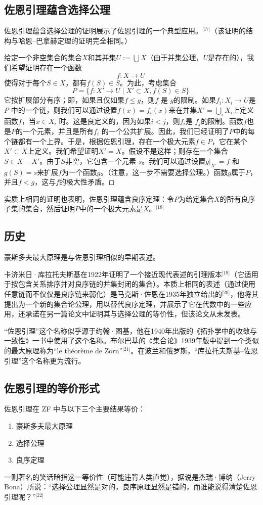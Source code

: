 \subsection{佐恩引理蕴含选择公理} 
佐恩引理蕴含选择公理的证明展示了佐恩引理的一个典型应用。\(^\text{[17]}\)（该证明的结构与哈恩–巴拿赫定理的证明完全相同。）

给定一个非空集合的集合\( X \)和其并集\( U := \bigcup X \)（由于并集公理，\( U \)是存在的），我们希望证明存在一个函数
\[
f : X \to U~
\]
使得对于每个\( S \in X \)，都有\( f(S) \in S \)。为此，考虑集合
\[
P = \{ f : X' \to U \mid X' \subset X, f(S) \in S \}~
\]
它按扩展部分有序；即，如果且仅如果\( f \leq g \)，则\( f \) 是 \( g \)的限制。如果\( f_i : X_i \to U \)是\( P \) 中的一个链，则我们可以通过设置\( f(x) = f_i(x) \)来在并集\( X' = \bigcup_i X_i \)上定义函数\( f \)，当\( x \in X_i \) 时。这是良定义的，因为如果\( i < j \)，则\( f_i \)是 \( f_j \)的限制。函数\( f \)也是\( P \)的一个元素，并且是所有\( f_i \) 的一个公共扩展。因此，我们已经证明了\( P \)中的每个链都有一个上界。于是，根据佐恩引理，存在一个极大元素\( f \in P \)，它在某个\( X' \subset X \)上定义。我们希望证明\( X' = X \)。假设不是这样；则存在一个集合\( S \in X - X' \)。由于\( S \)非空，它包含一个元素 \( s \)。我们可以通过设置\( g|_{X'} = f \) 和\( g(S) = s \)来扩展\( f \)为一个函数\( g \)。（注意，这一步不需要选择公理。）函数\( g \)属于\( P \)，并且\( f < g \)，这与\( f \)的极大性矛盾。◻

实质上相同的证明也表明，佐恩引理蕴含良序定理：令\( P \)为给定集合\( X \)的所有良序子集的集合，然后证明\( P \)中的一个极大元素是\( X \)。\(^\text{[18]}\)
\subsection{历史}  
豪斯多夫最大原理是与佐恩引理相似的早期表述。

卡济米日·库拉托夫斯基在1922年证明了一个接近现代表述的引理版本\(^\text{[19]}\)（它适用于按包含关系排序并对良序链的并集封闭的集合）。本质上相同的表述（通过使用任意链而不仅仅是良序链来弱化）是马克斯·佐恩在1935年独立给出的\(^\text{[20]}\)，他将其提出为一个新的集合论公理，用以替代良序定理，并展示了它在代数中的一些应用，还承诺在另一篇论文中证明其与选择公理的等价性，但该论文从未发表。

“佐恩引理”这个名称似乎源于约翰·图基，他在1940年出版的《拓扑学中的收敛与一致性》一书中使用了这个名称。布尔巴基的《集合论》1939年版中提到一个类似的最大原理称为“le théorème de Zorn”\(^\text{[21]}\)。在波兰和俄罗斯，“库拉托夫斯基–佐恩引理”这个名称更为流行。
\subsection{佐恩引理的等价形式}  
佐恩引理在 ZF 中与以下三个主要结果等价：
\begin{enumerate}
\item 豪斯多夫最大原理  
\item 选择公理  
\item 良序定理
\end{enumerate}
一则著名的笑话暗指这一等价性（可能违背人类直觉），据说是杰瑞·博纳（Jerry Bona）所说：“选择公理显然是对的，良序原理显然是错的，而谁能说得清楚佐恩引理呢？”\(^\text{[22]}\)

